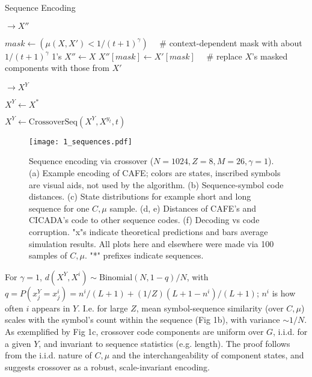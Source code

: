 \documentclass{article}
\begin{document}
\begin{algorithm}
\caption{Sequence Encoding}
\label{alg:1}

\begin{algorithmic}[0]
 $\rightarrow X''$

\State $mask \gets (\mu(X, X') < 1/(t+1)^\gamma) \quad$  \# context-dependent mask with about $1/(t+1)^\gamma$ 1's
\State $X'' \gets X$
\State $X''[mask] \gets X'[mask] \quad$  \# replace $X$'s masked components with those from $X'$

\EndFunction

\State 

 $\rightarrow X^Y$

\State $X^Y \gets X^*$

\State $X^Y \gets \textrm{CrossoverSeq}(X^Y, X^{y_t}, t)$

\EndFor

\EndFunction

\end{algorithmic}
\end{algorithm}

\begin{figure}
  \centering
  \texttt{[image: 1\_sequences.pdf]}
  \caption{Sequence encoding via crossover ($N=1024, Z=8, M=26, \gamma=1$). (a) Example encoding of CAFE; colors are states, inscribed symbols are visual aids, not used by the algorithm. (b) Sequence-symbol code distances. (c) State distributions for example short and long sequence for one $C, \mu$ sample. (d, e) Distances of CAFE's and CICADA's code to other sequence codes. (f) Decoding vs code corruption. "x"s indicate theoretical predictions and bars average simulation results. All plots here and elsewhere were made via 100 samples of $C, \mu$. "*" prefixes indicate sequences.}
  \label{fig:1}
\end{figure}

For $\gamma = 1$, $d(X^Y, X^i) \sim \textrm{Binomial}(N, 1-q)/N$, with $q = P(x^Y_j = x^i_j) = n^i/(L+1) + (1/Z)(L+1-n^i)/(L+1)$; $n^i$ is how often $i$ appears in $Y$. I.e. for large $Z$, mean symbol-sequence similarity (over $C, \mu$) scales with the symbol's count within the sequence (Fig 1b), with variance $\sim 1/N$. As exemplified by Fig 1c, crossover code components are uniform over $G$, i.i.d. for a given $Y$, and invariant to sequence statistics (e.g. length). The proof follows from the i.i.d. nature of $C, \mu$ and the interchangeability of component states, and suggests crossover as a robust, scale-invariant encoding.
\end{document}
